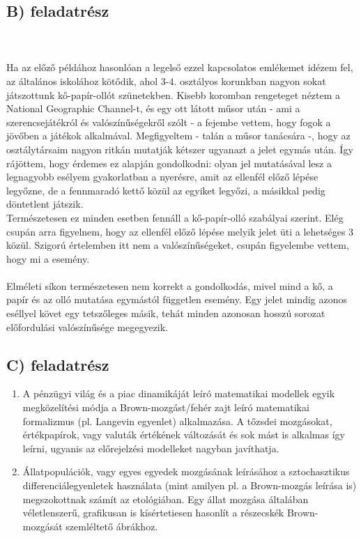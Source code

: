 \subsection*{B) feladatrész}
\\ \\
Ha az előző példához hasonlóan a legelső ezzel kapcsolatos emlékemet idézem fel, az általános iskolához kötődik, ahol $3$-$4$. osztályos korunkban nagyon sokat játszottunk kő-papír-ollót szünetekben. Kisebb koromban rengeteget néztem a National Geographic Channel-t, és egy ott látott műsor után - ami a szerencsejátékról és valószínűségekről szólt - a fejembe vettem, hogy  fogok a jövőben a játékok alkalmával. Megfigyeltem - talán a műsor tanácsára -, hogy az osztálytársaim nagyon ritkán mutatják kétszer ugyanazt a jelet egymás után. Így rájöttem, hogy érdemes ez alapján gondolkodni: olyan jel mutatásával lesz a legnagyobb esélyem gyakorlatban a nyerésre, amit az ellenfél előző lépése legyőzne, de a fennmaradó kettő közül az egyiket legyőzi, a másikkal pedig döntetlent játszik. \\
Természetesen ez minden esetben fennáll a kő-papír-olló szabályai szerint. Elég csupán arra figyelnem, hogy az ellenfél előző lépése melyik jelet üti a lehetséges $3$ közül. Szigorú értelemben itt nem  a valószínűségeket, csupán figyelembe vettem, hogy mi a  esemény.
\\ \\
Elméleti síkon természetesen nem korrekt a gondolkodás, mivel mind a kő, a papír és az olló mutatása egymástól független esemény. Egy jelet mindig azonos eséllyel követ egy tetszőleges másik, tehát minden azonosan hosszú sorozat előfordulási valószínűsége megegyezik.

\subsection*{C) feladatrész}

\begin{enumerate}
    \item A pénzügyi világ és a piac dinamikáját leíró matematikai modellek egyik megközelítési módja a Brown-mozgást/fehér zajt leíró matematikai formalizmus (pl. Langevin egyenlet\cite{2013ChPhL..30h8901T}) alkalmazása. A tőzsdei mozgásokat, értékpapírok, vagy valuták értékének változását és sok mást is alkalmas így leírni, ugyanis az előrejelzési modelleket nagyban javíthatja.
    \item Állatpopulációk, vagy egyes egyedek mozgásának leírásához a sztochasztikus differenciálegyenletek használata (mint amilyen pl. a Brown-mozgás leírása is) megszokottnak számít az etológiában. Egy állat mozgása általában véletlenszerű, grafikusan is kísértetiesen hasonlít a részecskék Brown-mozgását szemléltető ábrákhoz.\cite{brillinger2003simulating}\cite{pozdnyakov2014modeling}\cite{bearup2016revisiting}
\end{enumerate}